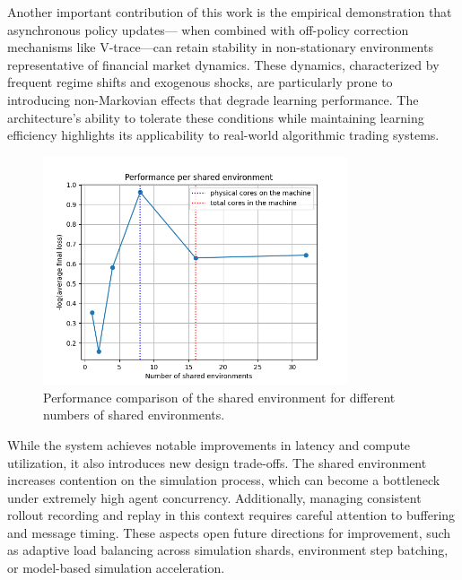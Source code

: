 Another important contribution of this work is the empirical demonstration that asynchronous policy updates---
when combined with off-policy correction mechanisms like V-trace---can retain stability in non-stationary environments representative of financial market dynamics.
These dynamics, characterized by frequent regime shifts and exogenous shocks, are particularly prone to introducing non-Markovian effects that degrade learning performance.
The architecture’s ability to tolerate these conditions while maintaining learning efficiency highlights its applicability to real-world algorithmic trading systems.

\begin{figure}
    \centering
    \includegraphics[width=0.8\textwidth]{img/performance}
    \caption{Performance comparison of the shared environment for different numbers of shared environments.}
    \label{fig:performance}
\end{figure}

While the system achieves notable improvements in latency and compute utilization, it also introduces new design trade-offs.
The shared environment increases contention on the simulation process, which can become a bottleneck under extremely high agent concurrency.
Additionally, managing consistent rollout recording and replay in this context requires careful attention to buffering and message timing.
These aspects open future directions for improvement, such as adaptive load balancing across simulation shards, environment step batching,
or model-based simulation acceleration.

